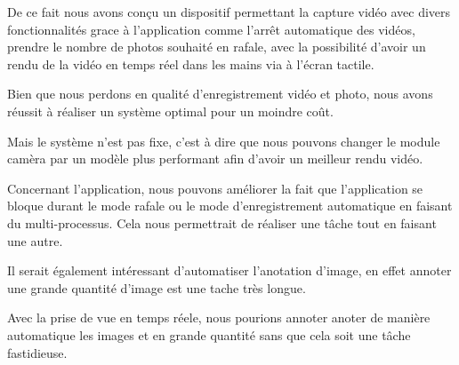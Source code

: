     \begin{flushleft}
        De ce fait nous avons conçu un dispositif permettant la capture vidéo avec divers fonctionnalités grace à l'application comme l'arrêt automatique des vidéos, prendre le nombre de photos souhaité en rafale, avec la possibilité d'avoir un rendu de la vidéo en temps réel dans les mains via à l'écran tactile.

        \vspace{0.2cm}

        Bien que nous perdons en qualité d'enregistrement vidéo et photo, nous avons réussit à réaliser un système optimal pour un moindre coût.

        \vspace{0.2cm}
    
        Mais le système n'est pas fixe, c'est à dire que nous pouvons changer le module camèra par un modèle plus performant afin d'avoir un meilleur rendu vidéo. 

        \vspace{0.2cm}

        Concernant l'application, nous pouvons améliorer la fait que l'application se bloque durant le mode rafale ou le mode d'enregistrement automatique en faisant du multi-processus.
        Cela nous permettrait de réaliser une tâche tout en faisant une autre.

        \vspace{0.2cm}

        Il serait également intéressant d'automatiser l'anotation d'image, en effet annoter une grande quantité d'image est une tache très longue.

        Avec la prise de vue en temps réele, nous pourions annoter anoter de manière automatique les images et en grande quantité sans que cela soit une tâche fastidieuse.
    \end{flushleft}


    
